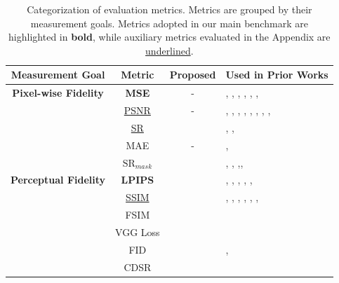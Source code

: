 \documentclass{article}
\begin{document}
\begin{table}[t!]
    \centering
    \small
    \scriptsize
    \caption{Categorization of evaluation metrics. Metrics are grouped by their measurement goals. Metrics adopted in our main benchmark are highlighted in \textbf{bold}, while auxiliary metrics evaluated in the Appendix are \underline{underlined}.}
    \label{tab:metric_reference}

    \begin{tabular}{c c c p{9.5cm}}
        \toprule
        \textbf{Measurement Goal} & \textbf{Metric} & \textbf{Proposed} & \textbf{Used in Prior Works} \\
        \midrule

        \multirow{1}{*}{\textbf{Pixel-wise Fidelity}}
         & \textbf{MSE} & - & \cite{ruiz2020disrupting}, \cite{wang2022anti}, \cite{qiao2024scalable}, \cite{qu2024df}, \cite{tang2024feature}, \cite{jeong2025faceshield}, \cite{shim2025leat} \\
         & \underline{PSNR} & - & \cite{wang2022anti}, \cite{aneja2022tafim}, \cite{van2023anti}, \cite{qiao2024scalable}, \cite{qu2024df}, \cite{tang2024feature}, \cite{jeong2025faceshield}, \cite{lee2025scol}, \cite{wang2025nullswap} \\
         & \underline{SR} & \cite{ruiz2020disrupting} & \cite{ruiz2020disrupting}, \cite{wang2022anti}, \cite{qu2024df} \\
         & MAE & - & \cite{ruiz2020disrupting}, \cite{qu2024df} \\
         & $\text{SR}_{mask}$ & \cite{huang2022cmua} & \cite{huang2022cmua}, \cite{zhang2024dual}, \cite{qiao2024scalable},\cite{tang2024feature}, \cite{qu2025id} \\
        \cmidrule(lr){1-4}

        \multirow{1}{*}{\textbf{Perceptual Fidelity}}
         & \textbf{LPIPS} & \cite{zhang2018unreasonable} & \cite{aneja2022tafim}, \cite{van2023anti}, \cite{qu2024df}, \cite{shim2025leat}, \cite{wang2025nullswap}, \cite{wang2025faceswapguard} \\
         & \underline{SSIM} & \cite{wang2004image} & \cite{wang2022anti}, \cite{dong2023restricted}, \cite{qiao2024scalable}, \cite{qu2024df}, \cite{tang2024feature}, \cite{lee2025scol}, \cite{wang2025nullswap} \\
         & FSIM & \cite{zhang2011fsim} & \cite{dong2023restricted} \\
         & VGG Loss & \cite{johnson2016perceptual} & \cite{aneja2022tafim} \\
         & FID & \cite{heusel2017gans} & \cite{huang2022cmua}, \cite{tang2024feature}\\
         & CDSR & \cite{shim2025leat} & \cite{shim2025leat} \\
        \cmidrule(lr){1-4}


\end{tabular}
\end{table}
\end{document}
